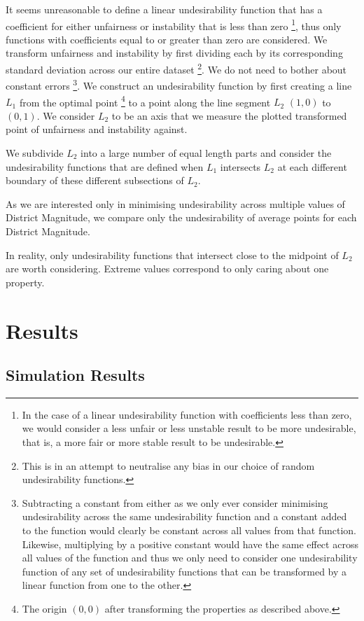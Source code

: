 \documentclass{article}
\begin{document}
It seems unreasonable to define a linear undesirability function that has a coefficient for either unfairness or instability that is less than zero \footnote{In the case of a linear undesirability function with coefficients less than zero, we would consider a less unfair or less unstable result to be more undesirable, that is, a more fair or more stable result to be undesirable.}, thus only functions with coefficients equal to or greater than zero are considered. We transform unfairness and instability by first dividing each by its corresponding standard deviation across our entire dataset \footnote{This is in an attempt to neutralise any bias in our choice of random undesirability functions.}. We do not need to bother about constant errors \footnote{Subtracting a constant from either as we only ever consider minimising undesirability across the same undesirability function and a constant added to the function would clearly be constant across all values from that function. Likewise, multiplying by a positive constant would have the same effect across all values of the function and thus we only need to consider one undesirability function of any set of undesirability functions that can be transformed by a linear function from one to the other.}. We construct an undesirability function by first creating a line $L_1$ from the optimal point \footnote{The origin $(0,0)$ after transforming the properties as described above.} to a point along the line segment $L_2$ $(1,0)$ to $(0,1)$. We consider $L_2$ to be an axis that we measure the plotted transformed point of unfairness and instability against.

We subdivide $L_2$ into a large number of equal length parts and consider the undesirability functions that are defined when $L_1$ intersects $L_2$ at each different boundary of these different subsections of $L_2$.

As we are interested only in minimising undesirability across multiple values of District Magnitude, we compare only the undesirability of average points for each District Magnitude.

In reality, only undesirability functions that intersect close to the midpoint of $L_2$ are worth considering. Extreme values correspond to only caring about one property.

\section{Results}
\subsection{Simulation Results}
\end{document}
